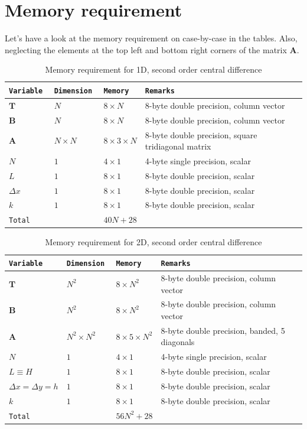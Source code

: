 \documentclass[12pt]{amsart}   %
\begin{document}
\section{Memory requirement}
Let's have a look at the memory requirement on case-by-case in the tables. Also, neglecting the elements at the top left and bottom right corners of the matrix \textbf{A}.
\begin{table}[htbp!] \caption{Memory requirement for 1D, second order central difference}
\begin{tabular}{lllll}
\tt{Variable} & \tt{Dimension} & \tt{Memory} & \tt{Remarks}  \\
\hline
 $\textbf{T}$ & $N$ & $8\times N$ & 8-byte double precision, column vector \\
 $\textbf{B}$ & $N$ & $8\times N$ & 8-byte double precision, column vector \\
 $\textbf{A}$ & $N \times N$ & $8 \times 3 \times N$ & 8-byte double precision, square tridiagonal matrix \\
 $N$ & $1$ & $4 \times1$ & 4-byte single precision, scalar \\
 $L$ & $1$ & $8 \times1$ & 8-byte double precision, scalar\\
 $\Delta x$ & $1$ & $8 \times 1$ & 8-byte double precision, scalar\\
 $k$ & $1$ & $8 \times 1$ & 8-byte double precision, scalar\\
 \hline
 \tt{Total} & & $40N + 28 $ & \\
\end{tabular}
\end{table}

\begin{table}[htbp!] \caption{Memory requirement for 2D, second order central difference}
\hspace{-3cm}
\begin{tabular}{lllll}
\tt{Variable} & \tt{Dimension} & \tt{Memory} & \tt{Remarks}  \\
\hline
 $\textbf{T}$ & $N^2$ & $8\times N^2$ & 8-byte double precision, column vector \\
 $\textbf{B}$ & $N^2$ & $8\times N^2$ & 8-byte double precision, column vector \\
 $\textbf{A}$ & $N^2 \times N^2$ & $8 \times 5 \times N^2$ & 8-byte double precision, banded, 5 diagonals \\
 $N$ & $1$ & $4 \times1$ & 4-byte single precision, scalar \\
 $L\equiv H$ & $1$ & $8 \times1$ & 8-byte double precision, scalar\\
 $\Delta x=\Delta y =h$ & $1$ & $8 \times 1$ & 8-byte double precision, scalar\\
 $k$ & $1$ & $8 \times 1$ & 8-byte double precision, scalar\\
 \hline
 \tt{Total} & & $56N^2 + 28 $ & \\
\end{tabular}
\end{table}
\end{document}
